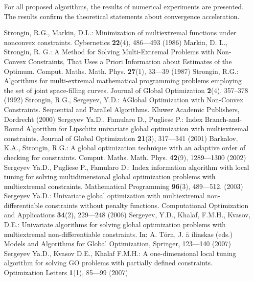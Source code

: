 For all proposed algorithms, the results of numerical experiments are presented. The results confirm the theoretical statements about convergence acceleration.
\begin{thebibliography}{99.}
   Strongin, R.G., Markin, D.L.: Minimization of multiextremal functions under nonconvex constraints. Cybernetics \textbf{22}(4), 486---493 (1986)
   Markin, D. L., Strongin, R. G.: A Method for Solving Multi-Extremal Problems with Non-Convex Constraints, That Uses a Priori Information about Estimates of the Optimum. Comput. Maths. Math. Phys. \textbf{27}(1), 33---39 (1987)
   Strongin, R.G.: Algorithms for multi-extremal mathematical programming problems employing the set of joint space-filling curves. Journal of Global Optimization \textbf{2}(4), 357--378 (1992)
   Strongin, R.G., Sergeyev, Y.D.: AGlobal Optimization with Non-Convex Constraints. Sequential and Parallel Algorithms. Kluwer Academic Publishers, Dordrecht (2000)
   Sergeyev Ya.D., Famularo D., Pugliese P.: Index Branch-and-Bound Algorithm for Lipschitz univariate global optimization with multiextremal constraints. Journal of Global Optimization \textbf{21}(3), 317---341 (2001)
   Barkalov, K.A., Strongin, R.G.: A global optimization technique with an adaptive order of checking for constraints. Comput. Maths. Math. Phys. \textbf{42}(9), 1289---1300 (2002)
   Sergeyev Ya.D., Pugliese P., Famularo D.: Index information algorithm with local tuning for solving multidimensional global optimization problems with multiextremal constraints. Mathematical Programming \textbf{96}(3), 489---512. (2003)
   Sergeyev Ya.D.: Univariate global optimization with multiextremal non-differentiable constraints without penalty functions. Computational Optimization and Applications \textbf{34}(2), 229---248 (2006)
   Sergeyev, Y.D., Khalaf, F.M.H., Kvasov, D.E.: Univariate algorithms for solving global optimization problems with multiextremal non-differentiable constraints. In: A. T\"orn, J. ä ilinskas (eds.) Models and Algorithms for Global Optimization, Springer, 123---140 (2007)
   Sergeyev Ya.D., Kvasov D.E., Khalaf F.M.H.: A one-dimensional local tuning algorithm for solving GO problems with partially defined constraints. Optimization Letters \textbf{1}(1), 85---99 (2007)
\end{thebibliography}
%

